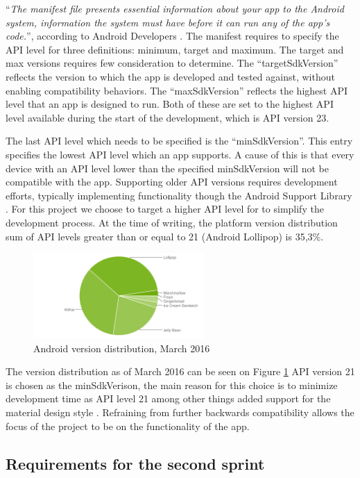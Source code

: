 ``\textit{The manifest file presents essential information about your app to the Android system, information the system must have before it can run any of the app's code.}'', according to Android Developers \cite{androidManifest}.
The manifest requires to specify the API level for three definitions: minimum, target and maximum. 
The target and max versions requires few consideration to determine.
The ``targetSdkVersion'' reflects the version to which the app is developed and tested against, without enabling compatibility behaviors.
The ``maxSdkVersion'' reflects the highest API level that an app is designed to run.
Both of these are set to the highest API level available during the start of the development, which is API version 23.

The last API level which needs to be specified is the ``minSdkVersion''.
This entry specifies the lowest API level which an app supports.
A cause of this is that every device with an API level lower than the specified minSdkVersion will not be compatible with the app.
Supporting older API versions requires development efforts, typically implementing functionality though the Android Support Library \cite{androidSL}.
For this project we choose to target a higher API level for to simplify the development process.
At the time of writing, the platform version distribution sum of API levels greater than or equal to 21 (Android Lollipop) is 35,3\%.
\begin{figure}
	\begin{center}
	\includegraphics[width=0.58\textwidth]{figures/android-chart-march.png}
	\end{center}
	\caption{Android version distribution, March 2016 \cite{androidDashboard}}
	\label{fig:dashboard}
\end{figure}
The version distribution as of March 2016 can be seen on Figure \ref{fig:dashboard}
API version 21 is chosen as the minSdkVerison, the main reason for this choice is to minimize development time as API level 21 among other things added support for the material design style \cite{android5API}. Refraining from further backwards compatibility allows the focus of the project to be on the functionality of the app. 






\subsection{Requirements for the second sprint}
